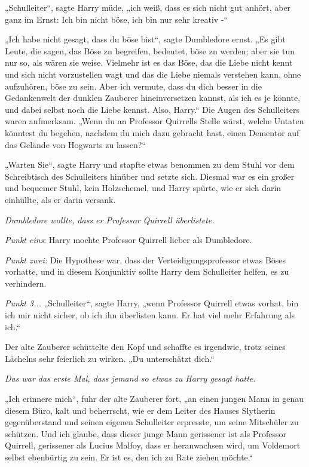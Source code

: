 {„Schulleiter“, sagte Harry müde, „ich weiß, dass es sich nicht gut anhört, aber ganz im Ernst: Ich bin nicht böse, ich bin nur sehr kreativ -“

„Ich habe nicht gesagt, dass du böse bist“, sagte Dumbledore ernst. „Es gibt Leute, die sagen, das Böse zu begreifen, bedeutet, böse zu werden; aber sie tun nur so, als wären sie weise. Vielmehr ist es das Böse, das die Liebe nicht kennt und sich nicht vorzustellen wagt und das die Liebe niemals verstehen kann, ohne aufzuhören, böse zu sein. Aber ich vermute, dass du dich besser in die Gedankenwelt der dunklen Zauberer hineinversetzen kannst, als ich es je könnte, und dabei selbst noch die Liebe kennst. Also, Harry.“ Die Augen des Schulleiters waren aufmerksam. „Wenn du an Professor Quirrells Stelle wärst, welche Untaten könntest du begehen, nachdem du mich dazu gebracht hast, einen Dementor auf das Gelände von Hogwarts zu lassen?“

„Warten Sie“, sagte Harry und stapfte etwas benommen zu dem Stuhl vor dem Schreibtisch des Schulleiters hinüber und setzte sich. Diesmal war es ein großer und bequemer Stuhl, kein Holzschemel, und Harry spürte, wie er sich darin einhüllte, als er darin versank.

\emph{Dumbledore wollte, dass er Professor Quirrell überlistete.}

\emph{Punkt eins}: Harry mochte Professor Quirrell lieber als Dumbledore.

\emph{Punkt zwei:} Die Hypothese war, dass der Verteidigungsprofessor etwas Böses vorhatte, und in diesem Konjunktiv sollte Harry dem Schulleiter helfen, es zu verhindern.

\emph{Punkt 3...} „Schulleiter“, sagte Harry, „wenn Professor Quirrell etwas vorhat, bin ich mir nicht sicher, ob ich ihn überlisten kann. Er hat viel mehr Erfahrung als ich.“

Der alte Zauberer schüttelte den Kopf und schaffte es irgendwie, trotz seines Lächelns sehr feierlich zu wirken. „Du unterschätzt dich.“

\emph{Das war das erste Mal, dass jemand so etwas zu Harry gesagt hatte.}

„Ich erinnere mich“, fuhr der alte Zauberer fort, „an einen jungen Mann in genau diesem Büro, kalt und beherrscht, wie er dem Leiter des Hauses Slytherin gegenüberstand und seinen eigenen Schulleiter erpresste, um seine Mitschüler zu schützen. Und ich glaube, dass dieser junge Mann gerissener ist als Professor Quirrell, gerissener als Lucius Malfoy, dass er heranwachsen wird, um Voldemort selbst ebenbürtig zu sein. Er ist es, den ich zu Rate ziehen möchte.“

}
